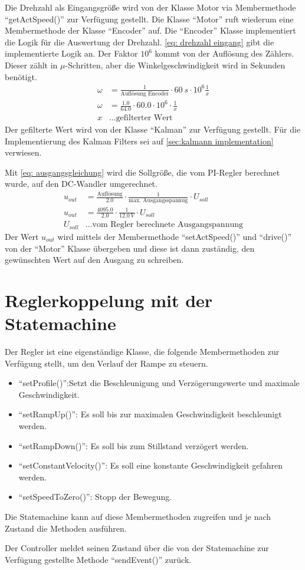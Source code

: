 \documentclass[./\jobname.tex]{subfiles}
\begin{document}
%
%
Die Drehzahl als Eingangsgröße wird von der Klasse Motor via Membermethode \enquote{getActSpeed()} zur Verfügung gestellt. Die Klasse \enquote{Motor} ruft wiederum eine Membermethode der Klasse \enquote{Encoder} auf. Die \enquote{Encoder} Klasse implementiert die Logik für die Auswertung der Drehzahl. \cref{eq: drehzahl eingang} gibt die implementierte Logik an. Der Faktor \(10^{6}\) kommt von der Auflösung des Zählers. Dieser zählt in \(\mu\)-Schritten, aber die Winkelgeschwindigkeit wird in Sekunden benötigt.
%
\begin{align}
\omega&=\frac{1}{\text{Auflösung Encoder}} \cdot 60~s \cdot10^{6} \frac{1}{x}\label{eq: drehzahl eingang}\\
\omega&= \frac{1.0 }{64.0} \cdot 60.0 \cdot 10^{6} \cdot \frac{1}{x}\\
x &\ldots \text{gefilterter Wert}
\end{align}
%
Der gefilterte Wert wird von der Klasse \enquote{Kalman} zur Verfügung gestellt. Für die Implementierung des Kalman Filters sei auf \autoref{sec:kalmann implementation} verwiesen.\par
%
Mit \cref{eq: ausgangsgleichung} wird die Sollgröße, die vom PI-Regler berechnet wurde, auf den DC-Wandler umgerechnet.
%
\begin{align}
u_{out} &= \frac{\text{Auflösung}}{2.0}\cdot\frac{1}{\text{max. Ausgangsspannug}} \cdot U_{soll}\label{eq: ausgangsgleichung}\\
u_{out} &= \frac{4095.0}{2.0}\cdot\frac{1}{12.0~V} \cdot U_{soll}\\
U_{soll}&\ldots\text{vom Regler berechnete Ausgangspannung}
\end{align}
%
Der Wert \(u_{out}\) wird mittels der Membermethode \enquote{setActSpeed()} und \enquote{drive()} von der \enquote{Motor} Klasse übergeben und diese ist dann zuständig, den gewünschten Wert auf den Ausgang zu schreiben.
%
\section{Reglerkoppelung mit der Statemachine}
%
Der Regler ist eine eigenständige Klasse, die folgende Membermethoden zur Verfügung stellt, um den Verlauf der Rampe zu steuern.
%
\begin{itemize}
	\item \enquote{setProfile()}:Setzt die Beschleunigung und Verzögerungswerte und maximale Geschwindigkeit.
	\item \enquote{setRampUp()}: Es soll bis zur maximalen Geschwindigkeit beschleunigt werden.
	\item \enquote{setRampDown()}: Es soll bis zum Stillstand verzögert werden.
	\item \enquote{setConstantVelocity()}: Es soll eine konstante Geschwindigkeit gefahren werden.
	\item \enquote{setSpeedToZero()}: Stopp der Bewegung.
\end{itemize}
%
Die Statemachine kann auf diese Membermethoden zugreifen und je nach Zustand die Methoden ausführen.\par
%
Der Controller meldet seinen Zustand über die von der Statemachine zur Verfügung gestellte Methode \enquote{sendEvent()} zurück.
%
\end{document}
